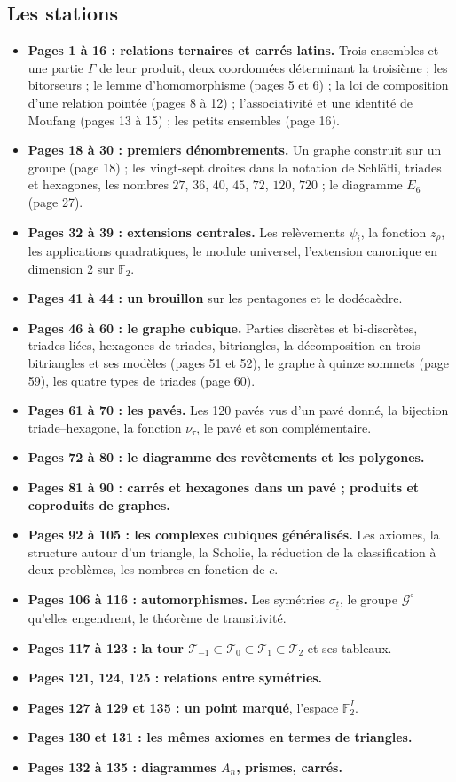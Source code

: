 \documentclass[11pt,a4paper]{article}
\begin{document}
\subsection*{Les stations}

\begin{itemize}
\item \textbf{Pages 1 à 16 : relations ternaires et carrés latins.} Trois
  ensembles et une partie $\Gamma$ de leur produit, deux coordonnées
  déterminant la troisième ; les bitorseurs ; le lemme d'homomorphisme
  (pages 5 et 6) ; la loi de composition d'une relation pointée (pages 8 à
  12) ; l'associativité et une identité de Moufang (pages 13 à 15) ; les
  petits ensembles (page 16).
\item \textbf{Pages 18 à 30 : premiers dénombrements.} Un graphe construit
  sur un groupe (page 18) ; les vingt-sept droites dans la notation de
  Schläfli, triades et hexagones, les nombres $27$, $36$, $40$, $45$, $72$,
  $120$, $720$ ; le diagramme $E_6$ (page 27).
\item \textbf{Pages 32 à 39 : extensions centrales.} Les relèvements
  $\psi_i$, la fonction $z_\rho$, les applications quadratiques, le module
  universel, l'extension canonique en dimension 2 sur $\mathbb{F}_2$.
\item \textbf{Pages 41 à 44 : un brouillon} sur les pentagones et le
  dodécaèdre.
\item \textbf{Pages 46 à 60 : le graphe cubique.} Parties discrètes et
  bi-discrètes, triades liées, hexagones de triades, bitriangles, la
  décomposition en trois bitriangles et ses modèles (pages 51 et 52), le graphe
  à quinze sommets (page 59), les quatre types de triades (page 60).
\item \textbf{Pages 61 à 70 : les pavés.} Les 120 pavés vus d'un pavé
  donné, la bijection triade--hexagone, la fonction $\nu_\tau$, le pavé et son
  complémentaire.
\item \textbf{Pages 72 à 80 : le diagramme des revêtements et les polygones.}
\item \textbf{Pages 81 à 90 : carrés et hexagones dans un pavé ; produits et
  coproduits de graphes.}
\item \textbf{Pages 92 à 105 : les complexes cubiques généralisés.} Les
  axiomes, la structure autour d'un triangle, la Scholie, la réduction de la
  classification à deux problèmes, les nombres en fonction de $c$.
\item \textbf{Pages 106 à 116 : automorphismes.} Les symétries
  $\sigma_{\underline t}$, le groupe $\mathcal{G}^\circ$ qu'elles engendrent,
  le théorème de transitivité.
\item \textbf{Pages 117 à 123 : la tour $\mathcal{T}_{-1} \subset
  \mathcal{T}_0 \subset \mathcal{T}_1 \subset \mathcal{T}_2$} et ses tableaux.
\item \textbf{Pages 121, 124, 125 : relations entre symétries.}
\item \textbf{Pages 127 à 129 et 135 : un point marqué}, l'espace
  $\mathbb{F}_2^I$.
\item \textbf{Pages 130 et 131 : les mêmes axiomes en termes de triangles.}
\item \textbf{Pages 132 à 135 : diagrammes $A_n$, prismes, carrés.}
\end{itemize}
\end{document}
